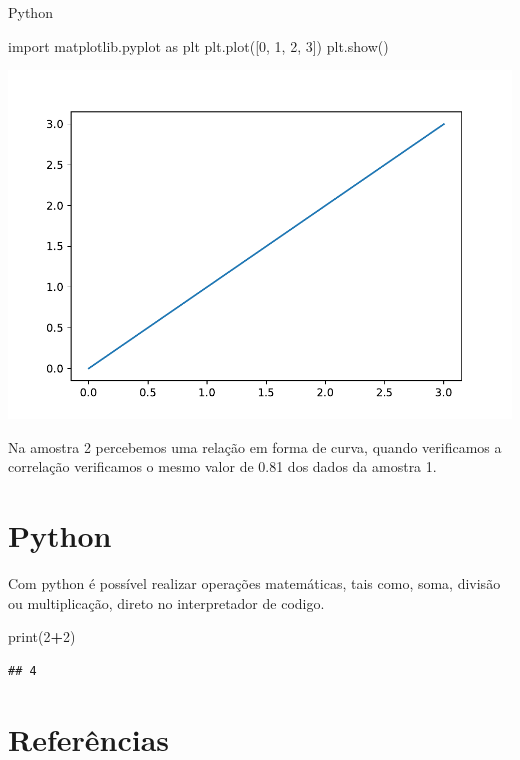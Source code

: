 \documentclass[
]{book}
\newenvironment{Shaded}{\begin{snugshade}}{\end{snugshade}}
\newcommand{\BuiltInTok}[1]{#1}
\newcommand{\DecValTok}[1]{\textcolor[rgb]{0.00,0.00,0.81}{#1}}
\newcommand{\ImportTok}[1]{#1}
\newcommand{\NormalTok}[1]{#1}
\newcommand{\OperatorTok}[1]{\textcolor[rgb]{0.81,0.36,0.00}{\textbf{#1}}}
\begin{document}
Python

\begin{Shaded}
\begin{Highlighting}[]
\ImportTok{import}\NormalTok{ matplotlib.pyplot }\ImportTok{as}\NormalTok{ plt}
\NormalTok{plt.plot([}\DecValTok{0}\NormalTok{, }\DecValTok{1}\NormalTok{, }\DecValTok{2}\NormalTok{, }\DecValTok{3}\NormalTok{])}
\NormalTok{plt.show()}
\end{Highlighting}
\end{Shaded}

\includegraphics{_main_files/figure-latex/unnamed-chunk-12-1.pdf}

Na amostra 2 percebemos uma relação em forma de curva, quando verificamos a correlação verificamos o mesmo valor de 0.81 dos dados da amostra 1.

\chapter{Python}\label{python}

Com python é possível realizar operações matemáticas, tais como, soma, divisão ou multiplicação, direto no interpretador de codigo.

\begin{Shaded}
\begin{Highlighting}[]
\BuiltInTok{print}\NormalTok{(}\DecValTok{2}\OperatorTok{+}\DecValTok{2}\NormalTok{)}
\end{Highlighting}
\end{Shaded}

\begin{verbatim}
## 4
\end{verbatim}

\chapter{Referências}\label{referuxeancias}

  
\end{document}
